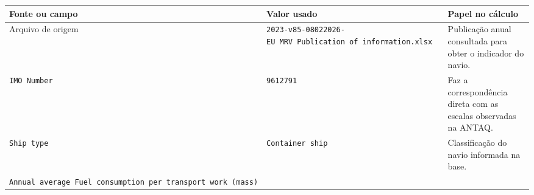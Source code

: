 \documentclass[brazil,]{article}
\begin{document}
\begin{longtable}[]{@{}lll@{}}
\toprule
\begin{minipage}[b]{0.30\columnwidth}\raggedright
Fonte ou campo\strut
\end{minipage} & \begin{minipage}[b]{0.30\columnwidth}\raggedright
Valor usado\strut
\end{minipage} & \begin{minipage}[b]{0.30\columnwidth}\raggedright
Papel no cálculo\strut
\end{minipage}\tabularnewline
\midrule
\endhead
\begin{minipage}[t]{0.30\columnwidth}\raggedright
Arquivo de origem\strut
\end{minipage} & \begin{minipage}[t]{0.30\columnwidth}\raggedright
\texttt{2023-v85-08022026-EU\ MRV\ Publication\ of\ information.xlsx}\strut
\end{minipage} & \begin{minipage}[t]{0.30\columnwidth}\raggedright
Publicação anual consultada para obter o indicador do navio.\strut
\end{minipage}\tabularnewline
\begin{minipage}[t]{0.30\columnwidth}\raggedright
\texttt{IMO\ Number}\strut
\end{minipage} & \begin{minipage}[t]{0.30\columnwidth}\raggedright
\texttt{9612791}\strut
\end{minipage} & \begin{minipage}[t]{0.30\columnwidth}\raggedright
Faz a correspondência direta com as escalas observadas na ANTAQ.\strut
\end{minipage}\tabularnewline
\begin{minipage}[t]{0.30\columnwidth}\raggedright
\texttt{Ship\ type}\strut
\end{minipage} & \begin{minipage}[t]{0.30\columnwidth}\raggedright
\texttt{Container\ ship}\strut
\end{minipage} & \begin{minipage}[t]{0.30\columnwidth}\raggedright
Classificação do navio informada na base.\strut
\end{minipage}\tabularnewline
\begin{minipage}[t]{0.30\columnwidth}\raggedright
\texttt{Annual\ average\ Fuel\ consumption\ per\ transport\ work\ (mass)}\strut
\end{minipage} & \begin{minipage}[t]{0.30\columnwidth}\raggedright

\end{minipage}
\end{longtable}
\end{document}
